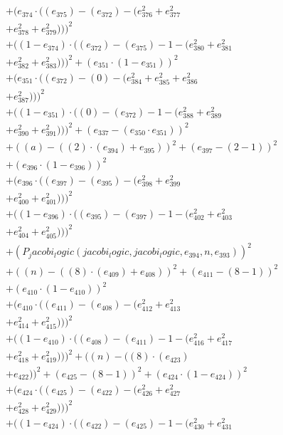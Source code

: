 \documentclass[10pt, a4paper]{article}
\begin{document}
\begin{small}
\begin{align*}
& + (e_{374}  \cdot  ((e_{375}) - (e_{372}) - (e_{376}^{2} + e_{377}^{2} \\
& + e_{378}^{2} + e_{379}^{2})))^{2} \\
& + ((1 - e_{374})  \cdot  ((e_{372}) - (e_{375}) - 1 - (e_{380}^{2} + e_{381}^{2} \\
& + e_{382}^{2} + e_{383}^{2})))^{2} + (e_{351}  \cdot  (1 - e_{351}))^{2} \\
& + (e_{351}  \cdot  ((e_{372}) - (0) - (e_{384}^{2} + e_{385}^{2} + e_{386}^{2} \\
& + e_{387}^{2})))^{2} \\
& + ((1 - e_{351})  \cdot  ((0) - (e_{372}) - 1 - (e_{388}^{2} + e_{389}^{2} \\
& + e_{390}^{2} + e_{391}^{2})))^{2} + (e_{337} - (e_{350}  \cdot  e_{351}))^{2} \\
& + ((a) - ((2)  \cdot  (e_{394}) + e_{395}))^{2} + (e_{397} - (2 - 1))^{2} \\
& + (e_{396}  \cdot  (1 - e_{396}))^{2} \\
& + (e_{396}  \cdot  ((e_{397}) - (e_{395}) - (e_{398}^{2} + e_{399}^{2} \\
& + e_{400}^{2} + e_{401}^{2})))^{2} \\
& + ((1 - e_{396})  \cdot  ((e_{395}) - (e_{397}) - 1 - (e_{402}^{2} + e_{403}^{2} \\
& + e_{404}^{2} + e_{405}^{2})))^{2} \\
& + (P_jacobi_logic(jacobi_logic, jacobi_logic, e_{394}, n, e_{393}))^{2} \\
& + ((n) - ((8)  \cdot  (e_{409}) + e_{408}))^{2} + (e_{411} - (8 - 1))^{2} \\
& + (e_{410}  \cdot  (1 - e_{410}))^{2} \\
& + (e_{410}  \cdot  ((e_{411}) - (e_{408}) - (e_{412}^{2} + e_{413}^{2} \\
& + e_{414}^{2} + e_{415}^{2})))^{2} \\
& + ((1 - e_{410})  \cdot  ((e_{408}) - (e_{411}) - 1 - (e_{416}^{2} + e_{417}^{2} \\
& + e_{418}^{2} + e_{419}^{2})))^{2} + ((n) - ((8)  \cdot  (e_{423}) \\
& + e_{422}))^{2} + (e_{425} - (8 - 1))^{2} + (e_{424}  \cdot  (1 - e_{424}))^{2} \\
& + (e_{424}  \cdot  ((e_{425}) - (e_{422}) - (e_{426}^{2} + e_{427}^{2} \\
& + e_{428}^{2} + e_{429}^{2})))^{2} \\
& + ((1 - e_{424})  \cdot  ((e_{422}) - (e_{425}) - 1 - (e_{430}^{2} + e_{431}^{2} \\

\end{align*}
\end{small}
\end{document}
